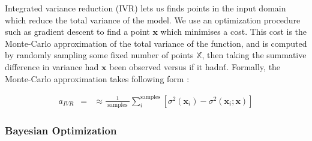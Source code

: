 Integrated variance reduction (IVR) lets us finds points in the input domain which reduce the total variance of the model. We use an optimization procedure such as gradient descent to find a point $\mathbf{x}$ which minimises a cost. This cost is the Monte-Carlo approximation of the total variance of the function, and is computed by randomly sampling some fixed number of points $\mathbb{X}$, then taking the summative difference in variance had $\mathbf{x}$ been observed  versus if it hadn\'t. Formally, the Monte-Carlo approximation takes following form \cite{EmukitExperimentalDesign2020, sacksDesignAnalysisComputer1989}:



\begin{equation}
\begin{aligned}
a_{I V R} &=
& \approx \frac{1}{\text { samples }} \sum_{i}^{\text {samples} }\left[\sigma^{2}\left(\mathbf{x}_{i}\right)-\sigma^{2}\left(\mathbf{x}_{i} ; \mathbf{x}\right)\right]
\end{aligned}
\end{equation}


\subsubsection{Bayesian Optimization}
\label{sec:bo_background}



